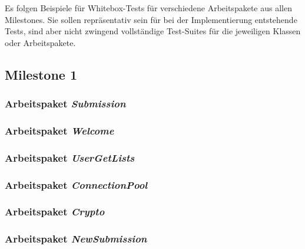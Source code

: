 \lstset{
    language=Java,
    basicstyle=\ttfamily\selectfont\scriptsize,
}

\newcommand{\testlisting}[1]{}

Es folgen Beispiele für Whitebox-Tests für verschiedene Arbeitspakete aus allen Milestones.
Sie sollen repräsentativ sein für bei der Implementierung entstehende Tests, sind aber nicht zwingend vollständige
Test-Suites für die jeweiligen Klassen oder Arbeitspakete.

\subsection{Milestone 1}\label{subsec:milestone1}

\subsubsection{Arbeitspaket \emph{Submission}}
\testlisting{SubmissionBackingTest}
\testlisting{SubmissionServiceTest}
\testlisting{SubmissionRepositoryTest}

\subsubsection{Arbeitspaket \emph{Welcome}}
\testlisting{LoginServiceTest}

\subsubsection{Arbeitspaket \emph{UserGetLists}}
\testlisting{UserRepositoryGetListTest}

\subsubsection{Arbeitspaket \emph{ConnectionPool}}
\testlisting{TransactionTest}
\testlisting{ConnectionPoolTest}

\subsubsection{Arbeitspaket \emph{Crypto}}
\testlisting{HashingTest}

\subsubsection{Arbeitspaket \emph{NewSubmission}}
\testlisting{ScientificForumServiceTest}

